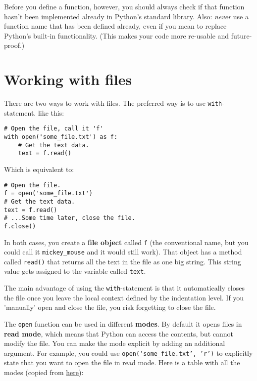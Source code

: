\documentclass[12pt]{book}
\begin{document}
Before you define a function, however, you should always check if that function hasn't been implemented already in Python's standard library. Also: \emph{never} use a function name that has been defined already, even if you mean to replace Python's built-in functionality. (This makes your code more re-usable and future-proof.)

\section{Working with files}

There are two ways to work with files. The preferred way is to use \texttt{with}-statement.
like this:

\begin{lstlisting}
# Open the file, call it 'f'
with open('some_file.txt') as f:
    # Get the text data.
    text = f.read()
\end{lstlisting}

Which is equivalent to:

\begin{lstlisting}
# Open the file.
f = open('some_file.txt')
# Get the text data.
text = f.read()
# ...Some time later, close the file.
f.close()
\end{lstlisting}

In both cases, you create a \textbf{file object} called \texttt{f} (the conventional name, but
you could call it \texttt{mickey\_mouse} and it would still work). That object has a method
called \texttt{read()} that returns all the text in the file as one big string. This string
value gets assigned to the variable called \texttt{text}.

The main advantage of using the \texttt{with}-statement is that it automatically closes
the file once you leave the local context defined by the indentation level. If you
'manually' open and close the file, you risk forgetting to close the file.

The \texttt{open} function can be used in different \textbf{modes}. By default it opens files
in \textbf{read mode}, which means that Python can access the contents, but cannot modify
the file. You can make the mode explicit by adding an additional argument. For example,
you could use \texttt{open('some\_file.txt', 'r')} to explicitly state that you want to open
the file in read mode. Here is a table with all the modes (copied from \href{https://docs.python.org/3.5/library/functions.html\#open}{here}):
\end{document}
